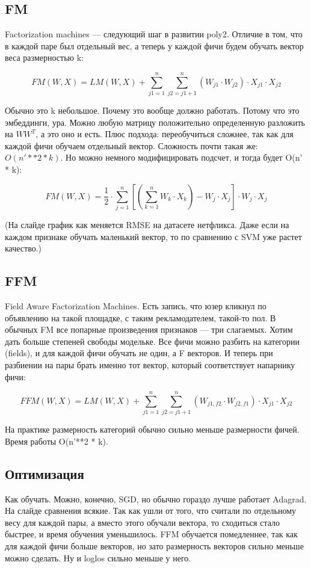 \subsection{FM} 

Factorization machines --- следующий шаг в развитии poly2. Отличие в том, что в каждой паре был отдельный вес, а теперь у каждой фичи будем обучать вектор веса размерностью k:

$$ FM(W, X) = LM(W, X) + \sum_{j1=1}^{n} {\sum_{j2=j1+1}^{n} (W_{j1} \cdot W_{j2})\cdot X_{j1} \cdot X_{j2}} $$

Обычно это k небольшое. Почему это вообще должно работать. Потому что это эмбеддинги, ура. Можно любую матрицу положительно определенную разложить на $WW^T$, а это оно и есть. Плюс подхода: переобучиться сложнее, так как для каждой фичи обучаем отдельный вектор. Сложность почти такая же: $O(n'**2 * k)$. Но можно немного модифицировать подсчет, и тогда будет O(n' * k):

$$ FM(W, X) = \frac{1}{2} \cdot \sum_{j=1}^{n} {[(\sum_{k=1}^{n} {W_k\cdot X_k}) - W_j\cdot X_j] \cdot W_j\cdot X_j} $$

(На слайде график как меняется RMSE на датасете нетфликса. Даже если на каждом признаке обучать маленький вектор, то по сравнению с SVM уже растет качество.)

\subsection{FFM} 

Field Aware Factorization Machines. Есть запись, что юзер кликнул по объявлению на такой площадке, с таким рекламодателем, такой-то пол. В обычных FM все попарные произведения признаков --- три слагаемых. Хотим дать больше степеней свободы модельке. Все фичи можно разбить на категории (fields), и для каждой фичи обучать не один, а F векторов. И теперь при разбиении на пары брать именно тот вектор, который соответствует напарнику фичи:

$$ FFM(W, X) = LM(W, X) + \sum_{j1=1}^{n} {\sum_{j2=j1+1}^{n} (W_{j1,f2} \cdot W_{j2,f1})\cdot X_{j1} \cdot X_{j2}} $$

На практике размерность категорий обычно сильно меньше размерности фичей. Время работы O(n'**2 * k).

\subsection{Оптимизация} 

Как обучать. Можно, конечно, SGD, но обычно гораздо лучше работает Adagrad. На слайде сравнения всякие. Так как ушли от того, что считали по отдельному весу для каждой пары, а вместо этого обучали вектора, то сходиться стало быстрее, и время обучения уменьшилось. FFM обучается помедленнее, так как для каждой фичи больше векторов, но зато размерность векторов сильно меньше можно сделать. Ну и loglos сильно меньше у него.

